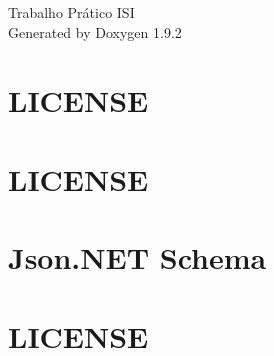 \documentclass[twoside]{book}
\newcommand{\+}{\discretionary{\mbox{\scriptsize$\hookleftarrow$}}{}{}}
\newcommand{\clearemptydoublepage}{%
    \newpage{\pagestyle{empty}\cleardoublepage}%
  }
\begin{document}
  \raggedbottom
    \hypersetup{pageanchor=false,
                bookmarksnumbered=true,
                pdfencoding=unicode
               }
  \begin{titlepage}
  \vspace*{7cm}
  \begin{center}%
  {\Large Trabalho Prático ISI}\\
  \vspace*{1cm}
  {\large Generated by Doxygen 1.9.2}\\
  \end{center}
  \end{titlepage}
  \clearemptydoublepage
  \tableofcontents
  \clearemptydoublepage
  \hypersetup{pageanchor=true}
\chapter{LICENSE}
\label{md__dashboard_packages__newtonsoft__json_13_0_1__l_i_c_e_n_s_e}

\chapter{LICENSE}
\label{md__file_conversion_packages__newtonsoft__json_13_0_1__l_i_c_e_n_s_e}

\chapter{Json.\+NET Schema}
\label{md__file_conversion_packages__newtonsoft__json__schema_3_0_14__l_i_c_e_n_s_e}

\chapter{LICENSE}
\label{md__r_e_s_t__a_p_i_service__client_rest_packages__newtonsoft__json_13_0_1__l_i_c_e_n_s_e}

\end{document}
